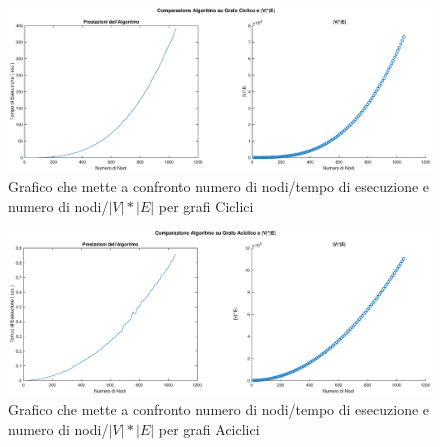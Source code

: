 \begin{figure}[H]
\vspace{-10pt}
    \includegraphics[width=\textwidth,height=\textheight,keepaspectratio]{./TeX_files/chart/Ciclico}
    \caption{Grafico che mette a confronto numero di nodi/tempo di esecuzione e  numero di nodi/$|V|*|E|$ per grafi Ciclici}
\vspace{-10pt}
\end{figure}

\begin{figure}[H]
	\vspace{-10pt}
	\includegraphics[width=\textwidth,height=\textheight,keepaspectratio]{./TeX_files/chart/Aciclico}
	\caption{Grafico che mette a confronto numero di nodi/tempo di esecuzione e  numero di nodi/$|V|*|E|$ per grafi Aciclici}
	\vspace{-10pt}
\end{figure}